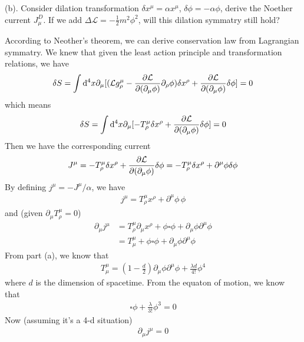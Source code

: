 \documentclass{article}
\newcommand{\id}{\int\dd^4x}
\begin{document}
\makebox{\phantom{\bf Additional}}\quad(b). Consider dilation transformation $\delta x^{\mu}=\alpha  x^{\mu}$, $\delta \phi=-\alpha\phi$, derive the Noether current $J_{\mu}^D$. If we add $\Delta\mathcal{L}=-\frac{1}{2}m^2\phi^2$, will this dilation symmatry still hold?

According to Neother's theorem, we can derive conservation law from Lagrangian symmatry. We knew that given the least action principle and transformation relations, we have
\begin{align}\label{deltaS}
  \delta S=\int\dd^4x\partial_{\mu}[(\mathcal{L}g^{\mu}_{\rho}-\pdv{\mathcal{L}}{(\partial_{\mu}\phi)}\partial_{\rho}\phi)\delta x^{\rho}+\pdv{\mathcal{L}}{(\partial_{\mu}\phi)}\delta\phi]=0
\end{align}
which means
\begin{align*}
  \delta S=\id \partial_{\mu}[-T^{\mu}_{\rho}\delta x^{\rho}+\pdv{\mathcal{L}}{(\partial_{\mu}\phi)}\delta\phi]=0
\end{align*}
Then we have the corresponding current
\begin{align*}
  J^{\mu}=-T^{\mu}_{\rho}\delta x^{\rho}+\pdv{\mathcal{L}}{(\partial_{\mu}\phi)}\delta\phi=-T^{\mu}_{\rho}\delta x^{\rho}+\partial^{\mu}\phi\delta\phi
\end{align*}
By defining $j^{\mu}=-J^{\mu}/\alpha$, we have
\begin{align*}
  j^{\mu}=T^{\mu}_{\rho}x^{\rho}+\partial^{\mu}\phi\,\phi
\end{align*}
and (given $\partial_{\mu}T^{\mu}_{\rho}=0$)
\begin{align*}
  \partial_{\mu}j^{\mu}&=T^{\mu}_{\rho}\partial_{\mu}x^{\rho}+\phi\square\phi+\partial_{\mu}\phi\partial^{\mu}\phi\\
  &=T^{\mu}_{\mu}+\phi\square\phi+\partial_{\mu}\phi\partial^{\mu}\phi
\end{align*}
From part (a), we know that
\begin{align*}
  T^{\mu}_{\mu}=(1-\frac{d}{2})\partial_{\mu}\phi\partial^{\mu}\phi+\frac{\lambda d}{4!}\phi^4
\end{align*}
where $d$ is the dimension of spacetime. From the equaton of motion, we know that
\begin{align*}
  \square\phi+\frac{\lambda}{3!}\phi^3=0
\end{align*}
Now (assuming it's a 4-d situation)
\begin{align*}
  \partial_{\mu}j^{\mu}=0
\end{align*}
\end{document}
